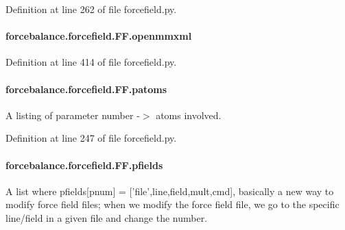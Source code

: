 Definition at line 262 of file forcefield.\-py.

\hypertarget{classforcebalance_1_1forcefield_1_1FF_aed4d7b3f12f4264b8a5afd70cffe80dc}{
\paragraph[{openmmxml}]{\setlength{\rightskip}{0pt plus 5cm}forcebalance.\-forcefield.\-F\-F.\-openmmxml}}\label{classforcebalance_1_1forcefield_1_1FF_aed4d7b3f12f4264b8a5afd70cffe80dc}


Definition at line 414 of file forcefield.\-py.

\hypertarget{classforcebalance_1_1forcefield_1_1FF_a3b22e1846666d6f704e0620413a95d14}{
\paragraph[{patoms}]{\setlength{\rightskip}{0pt plus 5cm}forcebalance.\-forcefield.\-F\-F.\-patoms}}\label{classforcebalance_1_1forcefield_1_1FF_a3b22e1846666d6f704e0620413a95d14}


A listing of parameter number -\/$>$ atoms involved. 



Definition at line 247 of file forcefield.\-py.

\hypertarget{classforcebalance_1_1forcefield_1_1FF_a8f5c9c11cd2f164a2ff6e310c1bc79f1}{
\paragraph[{pfields}]{\setlength{\rightskip}{0pt plus 5cm}forcebalance.\-forcefield.\-F\-F.\-pfields}}\label{classforcebalance_1_1forcefield_1_1FF_a8f5c9c11cd2f164a2ff6e310c1bc79f1}


A list where pfields\mbox{[}pnum\mbox{]} = \mbox{[}'file',line,field,mult,cmd\mbox{]}, basically a new way to modify force field files; when we modify the force field file, we go to the specific line/field in a given file and change the number. 



